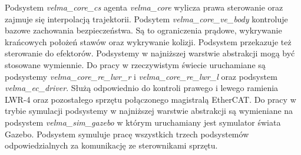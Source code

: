 	Podsystem \textit{velma\_core\_cs} agenta \textit{velma\_core} wylicza prawa sterowanie oraz zajmuje się interpolacją trajektorii. Podsytem \textit{velma\_core\_ve\_body} kontroluje bazowe zachowania bezpieczeństwa. Są to ograniczenia prądowe, wykrywanie krańcowych położeń stawów oraz wykrywanie kolizji. Podsystem przekazuje też sterowanie do efektorów. Podsystemy w najniższej warstwie abstrakcji mogą być stosowane wymiennie. Do pracy w rzeczywistym świecie uruchamiane są podsystemy \textit{velma\_core\_re\_lwr\_r} i \textit{velma\_core\_re\_lwr\_l} oraz podsystem \textit{velma\_ec\_driver}. Służą odpowiednio do kontroli prawego i lewego ramienia LWR-4 oraz pozostałego sprzętu połączonego magistralą EtherCAT. Do pracy w trybie symulacji podsystemy w najniższej warstwie abstrakcji są wymieniane na podsystem \textit{velma\_sim\_gazebo} w którym uruchamiany jest symulator świata Gazebo. Podsystem symuluje pracę wszystkich trzech podsystemów odpowiedzialnych za komunikację ze sterownikami sprzętu. 



